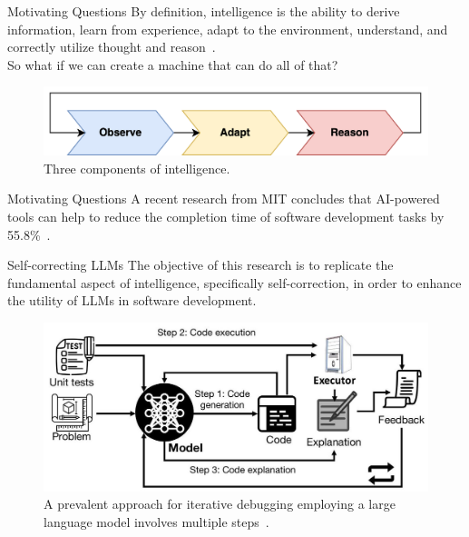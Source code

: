 \begin{frame}{Motivating Questions}
    By definition, intelligence is the ability to derive information, learn from experience, adapt to the environment, understand, and correctly utilize thought and reason~\cite{chollet2019measure}.\\
    \vspace{0.5cm}
    So what if we can create a machine that can do all of that?\\
    \vspace{1cm}
    \begin{figure}[!htb]
        \centering
        \includegraphics[scale=0.12]{img/intelligence}
        \captionsetup{font=small}
        \caption{Three components of intelligence.}
    \end{figure}
\end{frame}

\begin{frame}{Motivating Questions}
    \fontsize{14.4}{1}\selectfont A recent research from MIT concludes that AI-powered tools can help to reduce the completion time of software development tasks by 55.8\%~\cite{peng2023impact}.\\
    \vspace{1cm}
\end{frame}

\begin{frame}{Self-correcting LLMs}
    The objective of this research is to replicate the fundamental aspect of intelligence, specifically self-correction, in order to enhance the utility of LLMs in software development.\\
    \vspace{0.5cm}
    \begin{figure}[H]
        \centering
        \includegraphics[scale=0.20]{img/self_debug}
        \caption{
            A prevalent approach for iterative debugging employing a large language model involves multiple steps~\cite{chen2023teaching}.}\label{fig:self_debug}
    \end{figure}
\end{frame}
